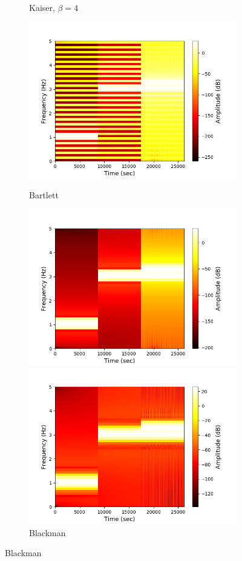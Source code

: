 \begin{figure}[H]
\begin{subfigure}{0.49\textwidth}
\caption{Kaiser, $\beta=4$}
\label{fig:stft_kaiser_100_4}
\end{subfigure}
\begin{subfigure}{0.49\textwidth}
\centering
\includegraphics[width=\textwidth]{figures/stft_windows/100/bartlett.png}
\caption{Bartlett}
\label{fig:stft_bartlett_100}
\includegraphics[width=\textwidth]{figures/stft_windows/100/blackman.png}
\caption{Blackman}
\label{fig:stft_blackman_100}
\includegraphics[width=\textwidth]{figures/stft_windows/100/kaiser_10.png}

\end{subfigure}
\end{figure}
